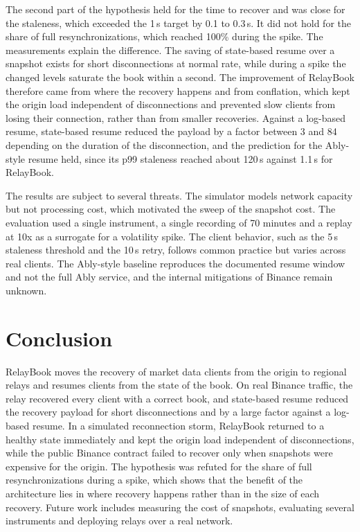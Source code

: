 \documentclass[conference]{IEEEtran}
\begin{document}
The second part of the hypothesis held for the time to recover and was close for the staleness, which exceeded the 1\,s target by 0.1 to 0.3\,s. It did not hold for the share of full resynchronizations, which reached 100\% during the spike. The measurements explain the difference. The saving of state-based resume over a snapshot exists for short disconnections at normal rate, while during a spike the changed levels saturate the book within a second. The improvement of RelayBook therefore came from where the recovery happens and from conflation, which kept the origin load independent of disconnections and prevented slow clients from losing their connection, rather than from smaller recoveries. Against a log-based resume, state-based resume reduced the payload by a factor between 3 and 84 depending on the duration of the disconnection, and the prediction for the Ably-style resume held, since its p99 staleness reached about 120\,s against 1.1\,s for RelayBook.

The results are subject to several threats. The simulator models network capacity but not processing cost, which motivated the sweep of the snapshot cost. The evaluation used a single instrument, a single recording of 70 minutes and a replay at 10x as a surrogate for a volatility spike. The client behavior, such as the 5\,s staleness threshold and the 10\,s retry, follows common practice but varies across real clients. The Ably-style baseline reproduces the documented resume window and not the full Ably service, and the internal mitigations of Binance remain unknown.

\section{Conclusion}

RelayBook moves the recovery of market data clients from the origin to regional relays and resumes clients from the state of the book. On real Binance traffic, the relay recovered every client with a correct book, and state-based resume reduced the recovery payload for short disconnections and by a large factor against a log-based resume. In a simulated reconnection storm, RelayBook returned to a healthy state immediately and kept the origin load independent of disconnections, while the public Binance contract failed to recover only when snapshots were expensive for the origin. The hypothesis was refuted for the share of full resynchronizations during a spike, which shows that the benefit of the architecture lies in where recovery happens rather than in the size of each recovery. Future work includes measuring the cost of snapshots, evaluating several instruments and deploying relays over a real network.



\end{document}
